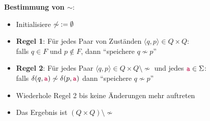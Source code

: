 \documentclass{beamer}
\newcommand{\tuple}[1]{\langle{#1}\rangle}
\begin{document}
	\begin{frame}
		\small
		
		\textbf{Bestimmung von $\sim$}:
		\vspace{-.7\baselineskip}
		\begin{itemize}
			\item Initialisiere ${\not\sim}\mathrel{:=}\emptyset$
			\item \textbf{Regel 1}: Für jedes Paar von Zuständen $\tuple{q,p}\in Q\times Q$:\\
			falls $q\in F$ und $p\notin F$, dann "`speichere $q\not\sim p$"'
			\item \textbf{Regel 2}: Für jedes Paar $\tuple{q,p}\in Q\times Q\setminus {\not\sim}$ und jedes $\mathtt{\textcolor{purple}{a}}\in\Sigma$:\\
			falls $\delta(q,\mathtt{\textcolor{purple}{a}})\not\sim\delta(p,\mathtt{\textcolor{purple}{a}})$ dann "`speichere $q\not\sim p$"'
			\item Wiederhole Regel 2 bis keine Änderungen mehr auftreten
			\item Das Ergebnis ist $(Q\times Q)\setminus {\not\sim}$
		\end{itemize}
		
	\end{frame}
	
\end{document}

